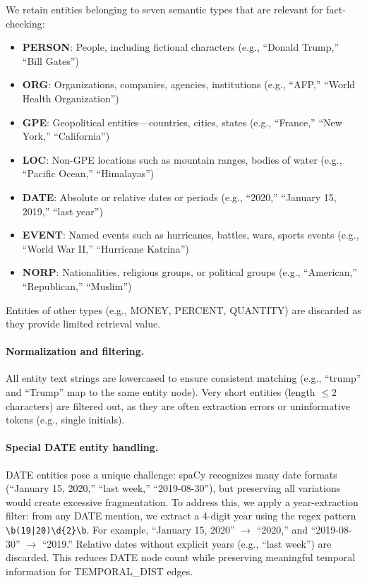 \documentclass[10pt]{article}
\begin{document}
We retain entities belonging to seven semantic types that are relevant for fact-checking:
\begin{itemize}[itemsep=2pt]
    \item \textbf{PERSON}: People, including fictional characters (e.g., ``Donald Trump,'' ``Bill Gates'')
    \item \textbf{ORG}: Organizations, companies, agencies, institutions (e.g., ``AFP,'' ``World Health Organization'')
    \item \textbf{GPE}: Geopolitical entities---countries, cities, states (e.g., ``France,'' ``New York,'' ``California'')
    \item \textbf{LOC}: Non-GPE locations such as mountain ranges, bodies of water (e.g., ``Pacific Ocean,'' ``Himalayas'')
    \item \textbf{DATE}: Absolute or relative dates or periods (e.g., ``2020,'' ``January 15, 2019,'' ``last year'')
    \item \textbf{EVENT}: Named events such as hurricanes, battles, wars, sports events (e.g., ``World War II,'' ``Hurricane Katrina'')
    \item \textbf{NORP}: Nationalities, religious groups, or political groups (e.g., ``American,'' ``Republican,'' ``Muslim'')
\end{itemize}

Entities of other types (e.g., MONEY, PERCENT, QUANTITY) are discarded as they provide limited retrieval value.

\paragraph{Normalization and filtering.} All entity text strings are lowercased to ensure consistent matching (e.g., ``trump'' and ``Trump'' map to the same entity node). Very short entities (length $\leq 2$ characters) are filtered out, as they are often extraction errors or uninformative tokens (e.g., single initials).

\paragraph{Special DATE entity handling.} DATE entities pose a unique challenge: spaCy recognizes many date formats (``January 15, 2020,'' ``last week,'' ``2019-08-30''), but preserving all variations would create excessive fragmentation. To address this, we apply a year-extraction filter: from any DATE mention, we extract a 4-digit year using the regex pattern \texttt{\textbackslash b(19|20)\textbackslash d\{2\}\textbackslash b}. For example, ``January 15, 2020'' $\rightarrow$ ``2020,'' and ``2019-08-30'' $\rightarrow$ ``2019.'' Relative dates without explicit years (e.g., ``last week'') are discarded. This reduces DATE node count while preserving meaningful temporal information for TEMPORAL\_DIST edges.
\end{document}
